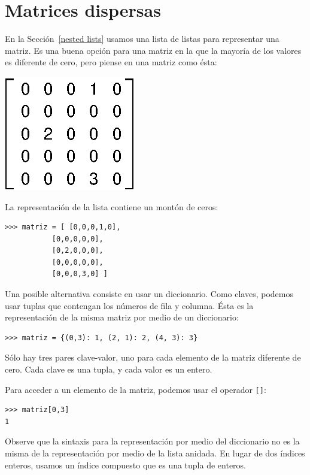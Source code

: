 \section{Matrices dispersas}

En la Sección~\ref{nested lists} usamos una lista de listas para representar una matriz. 
Es una buena opción para una matriz en la que la mayoría de los valores es diferente de cero, 
pero piense en una matriz como ésta:

\centerline{\includegraphics{illustrations/sparse.eps}}

La representación de la lista contiene un montón de ceros:

\begin{verbatim}
>>> matriz = [ [0,0,0,1,0],
           [0,0,0,0,0],
           [0,2,0,0,0],
           [0,0,0,0,0],
           [0,0,0,3,0] ]
\end{verbatim}
%
Una posible alternativa consiste en usar un diccionario. Como claves, podemos usar tuplas que contengan los números de fila y columna. Ésta es la representación de la misma matriz por medio de un diccionario:

\begin{verbatim}
>>> matriz = {(0,3): 1, (2, 1): 2, (4, 3): 3}
\end{verbatim}
%
Sólo hay tres pares clave-valor, uno para cada elemento de la matriz diferente de cero. Cada clave es una tupla, y cada valor es un entero.

Para acceder a un elemento de la matriz, podemos usar el operador \texttt{[]}:

\beforeverb
\begin{verbatim}
>>> matriz[0,3]
1
\end{verbatim}
\afterverb
%
Observe que la sintaxis para la representación por medio del diccionario no es la misma de la representación por medio de la lista anidada. En lugar de dos índices enteros, usamos un índice compuesto que es una tupla de enteros.

